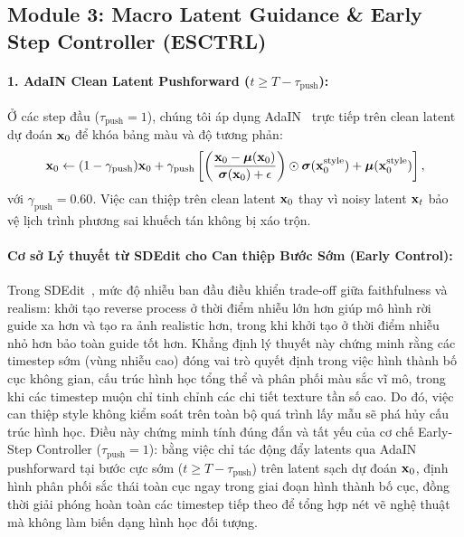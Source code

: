 \documentclass[runningheads]{llncs}
\begin{document}
\subsection{Module 3: Macro Latent Guidance \& Early Step Controller (ESCTRL)}
\label{subsec:macro_guidance}

\paragraph{1. AdaIN Clean Latent Pushforward ($t \ge T - \tau_{\text{push}}$):}
Ở các step đầu ($\tau_{\text{push}} = 1$), chúng tôi áp dụng AdaIN~\cite{AdaIn} trực tiếp trên clean latent dự đoán $\mathbf{x}_0$ để khóa bảng màu và độ tương phản:
\begin{equation}
    \mathbf{x}_0 \leftarrow (1 - \gamma_{\text{push}}) \mathbf{x}_0 + \gamma_{\text{push}} \left[ \left( \frac{\mathbf{x}_0 - \boldsymbol{\mu}(\mathbf{x}_0)}{\boldsymbol{\sigma}(\mathbf{x}_0) + \epsilon} \right) \odot \boldsymbol{\sigma}(\mathbf{x}_0^{\text{style}}) + \boldsymbol{\mu}(\mathbf{x}_0^{\text{style}}) \right],
\end{equation}
với $\gamma_{\text{push}} = 0.60$. Việc can thiệp trên clean latent $\mathbf{x}_0$ thay vì noisy latent $\mathbf{x}_t$ bảo vệ lịch trình phương sai khuếch tán không bị xáo trộn.

\paragraph{Cơ sở Lý thuyết từ SDEdit cho Can thiệp Bước Sớm (Early Control):}
Trong SDEdit~\cite{sdedit}, mức độ nhiễu ban đầu điều khiển trade-off giữa faithfulness và realism: khởi tạo reverse process ở thời điểm nhiễu lớn hơn giúp mô hình rời guide xa hơn và tạo ra ảnh realistic hơn, trong khi khởi tạo ở thời điểm nhiễu nhỏ hơn bảo toàn guide tốt hơn. Khẳng định lý thuyết này chứng minh rằng các timestep sớm (vùng nhiễu cao) đóng vai trò quyết định trong việc hình thành bố cục không gian, cấu trúc hình học tổng thể và phân phối màu sắc vĩ mô, trong khi các timestep muộn chỉ tinh chỉnh các chi tiết texture tần số cao. Do đó, việc can thiệp style không kiểm soát trên toàn bộ quá trình lấy mẫu sẽ phá hủy cấu trúc hình học. Điều này chứng minh tính đúng đắn và tất yếu của cơ chế Early-Step Controller ($\tau_{\text{push}} = 1$): bằng việc chỉ tác động đẩy latents qua AdaIN pushforward tại bước cực sớm ($t \ge T - \tau_{\text{push}}$) trên latent sạch dự đoán $\mathbf{x}_0$, \method định hình phân phối sắc thái toàn cục ngay trong giai đoạn hình thành bố cục, đồng thời giải phóng hoàn toàn các timestep tiếp theo để tổng hợp nét vẽ nghệ thuật mà không làm biến dạng hình học đối tượng.
\end{document}

